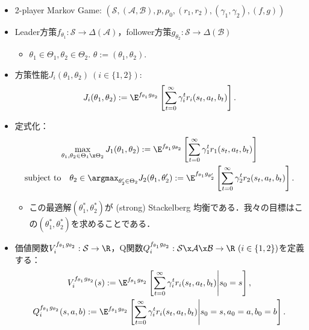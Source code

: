 \documentclass[a4paper,10pt,dvipdfmx]{jsarticle}
\begin{document}
\begin{itemize}
    \item 2-player Markov Game: $(\mathcal{S}, (\mathcal{A},\mathcal{B}), p, \rho_0, (r_1,r_2), (\gamma_1,\gamma_2),(f,g))$
    \item Leader方策$f_{\theta_1}:\mathcal{S}\to\Delta(\mathcal{A})$，follower方策$g_{\theta_2}:\mathcal{S}\to\Delta(\mathcal{B})$
    \begin{itemize}
        \item $\theta_1\in\Theta_1, \theta_2\in\Theta_2$. $\theta:=(\theta_1,\theta_2)$.
    \end{itemize}
    \item 方策性能$J_i(\theta_1,\theta_2)~(i\in\{1,2\})$:
    \begin{align}
        J_i(\theta_1,\theta_2):=\E^{f_{\theta_1}g_{\theta_2}}\left[\sum_{t=0}^\infty\gamma_i^tr_i(s_t,a_t,b_t)\right].
    \end{align}
    \item 定式化：
    \begin{subequations}
    \begin{gather}
        \max_{\theta_1,\theta_2\in\Theta_1\x\Theta_2} J_1(\theta_1,\theta_2):=\E^{f_{\theta_1}g_{\theta_2}}\left[\sum_{t=0}^\infty \gamma_1^tr_1(s_t,a_t,b_t)\right]\label{eq:formula_SSPG_a}\\
        \mathrm{subject~to}\quad \theta_2\in\argmax_{\theta_2'\in\Theta_2} J_2(\theta_1,\theta_2'):=\E^{f_{\theta_1}g_{\theta_2'}}\left[\sum_{t=0}^\infty \gamma_2^tr_2(s_t,a_t,b_t)\right].\label{eq:formula_SSPG_b}
    \end{gather}\label{eq:formula_SSPG}
    \end{subequations}
    \begin{itemize}
        \item この最適解$(\theta_1^*,\theta_2^*)$が (strong) Stackelberg 均衡である．我々の目標はこの$(\theta_1^*,\theta_2^*)$を求めることである．
    \end{itemize}
    \item 価値関数$V_i^{f_{\theta_1}g_{\theta_2}}:\mathcal{S}\to\R$，Q関数$Q_i^{f_{\theta_1}g_{\theta_2}}:\mathcal{S}\x\mathcal{A}\x\mathcal{B}\to\R~(i\in\{1,2\})$を定義する：
    \begin{gather}
        V_i^{f_{\theta_1}g_{\theta_2}}(s):=\E^{f_{\theta_1}g_{\theta_2}}\left[\sum_{t=0}^\infty\gamma_i^tr_i(s_t,a_t,b_t)\middle|s_0=s\right],\\
        Q_i^{f_{\theta_1}g_{\theta_2}}(s,a,b):=\E^{f_{\theta_1}g_{\theta_2}}\left[\sum_{t=0}^\infty\gamma_i^tr_i(s_t,a_t,b_t)\middle|s_0=s,a_0=a,b_0=b\right].
    \end{gather}
\end{itemize}
\end{document}
